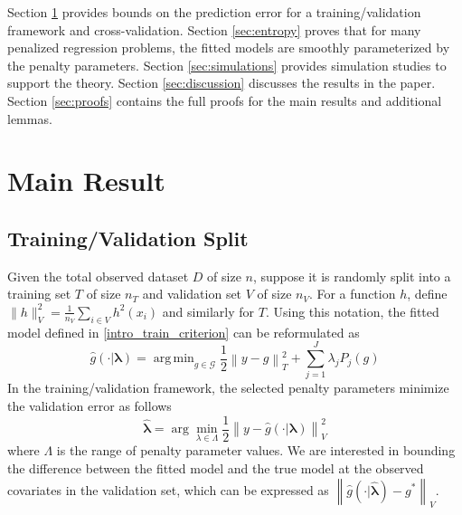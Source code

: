 \documentclass[12pt]{article}
\DeclareMathOperator*{\argmin}{arg\,min}
\begin{document}
Section \ref{sec:main_results} provides bounds on the prediction error for a training/validation framework and cross-validation.
Section \ref{sec:entropy} proves that for many penalized regression problems, the fitted models are smoothly parameterized by the penalty parameters.
Section \ref{sec:simulations} provides simulation studies to support the theory.
Section \ref{sec:discussion} discusses the results in the paper.
Section \ref{sec:proofs} contains the full proofs for the main results and additional lemmas.

\section{Main Result} \label{sec:main_results}

\subsection{Training/Validation Split}

Given the total observed dataset $D$ of size $n$, suppose it is randomly split into a training set $T$ of size $n_T$ and validation set $V$ of size $n_V$. For a function $h$, define $\| h \|_V^2 = \frac{1}{n_V}\sum_{i\in V} h^2(x_i)$ and similarly for $T$. Using this notation, the fitted model defined in  \eqref{intro_train_criterion} can be reformulated as
\begin{equation}
\hat{g}(\cdot | \boldsymbol \lambda) = \argmin_{g\in \mathcal{G}} \frac{1}{2} \left \|y -  g \right \|_T^2 + \sum_{j=1}^J \lambda_j P_j(g)
\end{equation}
In the training/validation framework, the selected penalty parameters minimize the validation error as follows
\begin{equation}
\label{cv_lambda}
\hat{\boldsymbol \lambda} = \arg\min_{\lambda\in\Lambda} \frac{1}{2} \left \| y-\hat{g}(\cdot | \boldsymbol \lambda) \right \|_{V}^{2}
\end{equation}
where $\Lambda$ is the range of penalty parameter values. We are interested in bounding the difference between the fitted model and the true model at the observed covariates in the validation set, which can be expressed as $\left \|\hat{g}(\cdot | \hat{\boldsymbol \lambda}) - g^* \right \|_V$.
\end{document}

